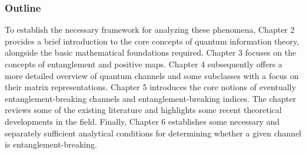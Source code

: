 \subsubsection{Outline}
To establish the necessary framework for analyzing these phenomena, Chapter 2 provides a brief introduction to the core concepts of quantum information theory, alongside the basic mathematical foundations required. Chapter 3 focuses on the concepts of entanglement and positive maps. Chapter 4 subsequently offers a more detailed overview of quantum channels and some subclasses with a focus on their matrix representations. Chapter 5 introduces the core notions of eventually entanglement-breaking channels and entanglement-breaking indices. The chapter reviews some of the existing literature and highlights some recent theoretical developments in the field. Finally, Chapter 6 establishes some necessary and separately sufficient analytical conditions for determining whether a given channel is entanglement-breaking.
